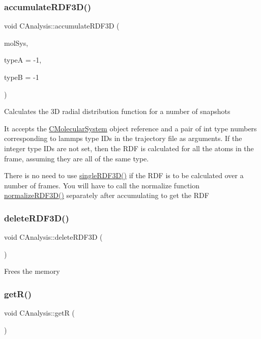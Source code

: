 \subsubsection{\texorpdfstring{accumulate\+R\+D\+F3\+D()}{accumulateRDF3D()}}
{\footnotesize\ttfamily void C\+Analysis\+::accumulate\+R\+D\+F3D (\begin{DoxyParamCaption}\item[{class \mbox{\hyperlink{classCMolecularSystem}{C\+Molecular\+System}} \&}]{mol\+Sys,  }\item[{int}]{typeA = {\ttfamily -\/1},  }\item[{int}]{typeB = {\ttfamily -\/1} }\end{DoxyParamCaption})}

Calculates the 3D radial distribution function for a number of snapshots

It accepts the \mbox{\hyperlink{classCMolecularSystem}{C\+Molecular\+System}} object reference and a pair of int type numbers corresponding to lammps type I\+Ds in the trajectory file as arguments. If the integer type I\+Ds are not set, then the R\+DF is calculated for all the atoms in the frame, assuming they are all of the same type.

There is no need to use \mbox{\hyperlink{classCAnalysis_ab3566f13bda907427f28c82706ac3aec}{single\+R\+D\+F3\+D()}} if the R\+DF is to be calculated over a number of frames. You will have to call the normalize function \mbox{\hyperlink{classCAnalysis_a1716c9da84e9d41cbb32b97f7708e9f7}{normalize\+R\+D\+F3\+D()}} separately after accumulating to get the R\+DF \mbox{\label{classCAnalysis_ae54948a0123c7ef52857e47363923500}} 
\subsubsection{\texorpdfstring{delete\+R\+D\+F3\+D()}{deleteRDF3D()}}
{\footnotesize\ttfamily void C\+Analysis\+::delete\+R\+D\+F3D (\begin{DoxyParamCaption}{ }\end{DoxyParamCaption})}

Frees the memory \mbox{\label{classCAnalysis_ac90e1a07030a0954036f4461562b0c1b}} 
\subsubsection{\texorpdfstring{get\+R()}{getR()}}
{\footnotesize\ttfamily void C\+Analysis\+::getR (\begin{DoxyParamCaption}{ }\end{DoxyParamCaption})}

